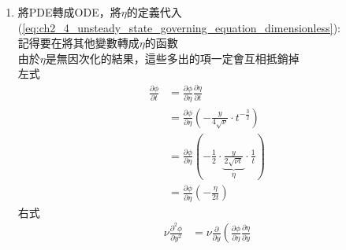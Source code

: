 \documentclass[../main.tex]{subfiles}
\begin{document}
\begin{itemize}
\begin{enumerate}
\begin{itemize}
\begin{enumerate}
          由於$\eta$是無因次的，所以我們也要將我們要解的目標$u_x(y,t)$無因次化成$\phi(\eta)$:\\
          而此題因為具有特徵的抽板速度$U$，所以可以用$U$來無因次化:
          \begin{equation}
            \phi(\eta) = \frac{u_x(y,t)}{U}
          \end{equation}
          而邊界條件將被改寫為:
          \begin{align}
            & \phi(y,0) = 0 \label{eq:ch2_4_initial_condition_2_1}\\
            & \phi(0,t) = 1 \label{eq:ch2_4_boundary_condition_2_2}\\
            & \phi(\infty,t) = 0 \label{eq:ch2_4_boundary_condition_2_3}
          \end{align}
          而(\ref{eq:ch2_4_unsteady_state_governing_equation})將被改寫為:
          \begin{equation}
            \frac{\partial \phi}{\partial t} = \nu \frac{\partial^2 \phi}{\partial y^2} \label{eq:ch2_4_unsteady_state_governing_equation_dimensionless}
          \end{equation}
        \item 將PDE轉成ODE，將$\eta$的定義代入(\ref{eq:ch2_4_unsteady_state_governing_equation_dimensionless}):\\
        記得要在將其他變數轉成$\eta$的函數\\
        由於$\eta$是無因次化的結果，這些多出的項一定會互相抵銷掉\\
        左式
        \begin{align}
          \frac{\partial \phi}{\partial t} &= \frac{\partial \phi}{\partial \eta}\frac{\partial \eta}{\partial t} \nonumber\\
          &= \frac{\partial \phi}{\partial \eta}\left(
           -\frac{y}{4\sqrt{\nu}}\cdot t^{-\frac{3}{2}}
          \right) \nonumber\\
          &= \frac{\partial \phi}{\partial \eta}\left(
           -\frac{1}{2}\cdot\underbrace{\frac{y}{2\sqrt{\nu t}}}_{\eta}\cdot \frac{1}{t}
          \right) \nonumber\\
          &= \frac{\partial \phi}{\partial \eta}\left(
           -\frac{\eta}{2t}
          \right) \label{eq:ch2_4_unsteady_state_partial_phi_partial_t}
        \end{align}
        右式
        \begin{align}
          \nu \frac{\partial^2 \phi}{\partial y^2} &= \nu \frac{\partial}{\partial y}\left(
            \frac{\partial \phi}{\partial \eta}\frac{\partial \eta}{\partial y}

\end{align}
\end{enumerate}
\end{itemize}
\end{enumerate}
\end{itemize}
\end{document}
